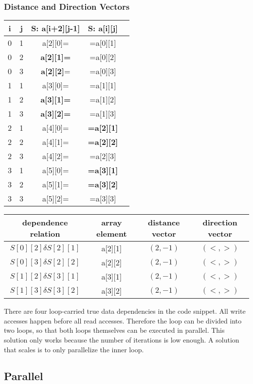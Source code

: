 \documentclass[parskip]{scrartcl}
\begin{document}
	\subsubsection{Distance and Direction Vectors}
	\begin{tabular}{|c|c|c|c|c|}
		\hline i & j & S: a[i+2][j-1] & S: a[i][j]\\
		\hline 0 & 1 & a[2][0]= & =a[0][1]\\
		\hline 0 & 2 & \textbf{a[2][1]=} & =a[0][2]\\
		\hline 0 & 3 & \textbf{a[2][2]}= & =a[0][3]\\
		\hline 1 & 1 & a[3][0]= & =a[1][1]\\
		\hline 1 & 2 & \textbf{a[3][1]=} & =a[1][2]\\
		\hline 1 & 3 & \textbf{a[3][2]=} & =a[1][3]\\
		\hline 2 & 1 & a[4][0]= & \textbf{=a[2][1]}\\
		\hline 2 & 2 & a[4][1]= & \textbf{=a[2][2]}\\
		\hline 2 & 3 & a[4][2]= & =a[2][3]\\		
		\hline 3 & 1 & a[5][0]= & \textbf{=a[3][1]}\\
		\hline 3 & 2 & a[5][1]= & \textbf{=a[3][2]}\\
		\hline 3 & 3 & a[5][2]= & =a[3][3]\\
		\hline
	\end{tabular}
	
	\begin{tabular}{|c|c|c|c|}
		\hline dependence relation & array element & distance vector & direction vector\\
		\hline $S[0][2]\delta S[2][1]$ & a[2][1] & $(2,-1)$ & $(<,>)$\\
		\hline $S[0][3]\delta S[2][2]$ & a[2][2] & $(2,-1)$ & $(<,>)$\\
		\hline $S[1][2]\delta S[3][1]$ & a[3][1] & $(2,-1)$ & $(<,>)$\\
		\hline $S[1][3]\delta S[3][2]$ & a[3][2] & $(2,-1)$ & $(<,>)$\\
		\hline
	\end{tabular}
	
	There are four loop-carried true data dependencies in the code snippet. All write accesses happen before all read accesses. Therefore the loop can be divided into two loops, so that both loops themselves can be executed in parallel. This solution only works because the number of iterations is low enough. A solution that scales is to only parallelize the inner loop.
	\subsection{Parallel}
	\inputminted	[linenos]{c}{ex3/parallel.c}
\end{document}
